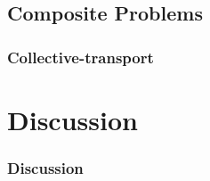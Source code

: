 \documentclass{beamer}
\begin{document}
\subsection{Composite Problems}
\begin{frame}\frametitle{\textbf{\LARGE{\textrm{Collective-transport}}}}
\end{frame}

\section{Discussion}
\begin{frame}\frametitle{\textbf{\LARGE{\textrm{Discussion}}}}
\end{frame}
\end{document}
